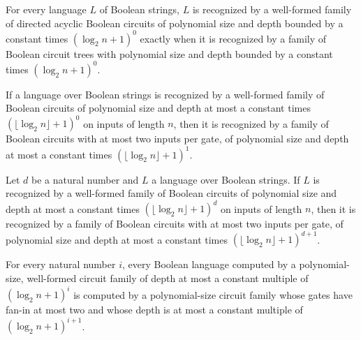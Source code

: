 \begin{theorem}
\label{Language.inAC_zero_iff}
\leanok
{}
For every language $L$ of Boolean strings, $L$ is recognized by a well-formed family of
directed acyclic Boolean circuits of polynomial size and depth bounded by a constant
times $(\log_2 n+1)^0$ exactly when it is recognized by a family of Boolean circuit
trees with polynomial size and depth bounded by a constant times $(\log_2 n+1)^0$.
\end{theorem}

\begin{theorem}
\label{Language.InAC.inNC_one_of_zero}
\leanok
{}
If a language over Boolean strings is recognized by a well-formed family of Boolean
circuits of polynomial size and depth at most a constant times $(\lfloor\log_2
n\rfloor+1)^0$ on inputs of length $n$, then it is recognized by a family of Boolean
circuits with at most two inputs per gate, of polynomial size and depth at most a
constant times $(\lfloor\log_2 n\rfloor+1)^1$.
\end{theorem}

\begin{theorem}
\label{Language.InAC.inNC_succ}
\leanok
{}
Let $d$ be a natural number and $L$ a language over Boolean strings. If $L$ is
recognized by a well-formed family of Boolean circuits of polynomial size and depth at
most a constant times $(\lfloor\log_2 n\rfloor+1)^d$ on inputs of length $n$, then it is
recognized by a family of Boolean circuits with at most two inputs per gate, of
polynomial size and depth at most a constant times $(\lfloor\log_2 n\rfloor+1)^{d+1}$.
\end{theorem}

\begin{theorem}
\label{BoolCircuit.ACLevel_subset_NCLevel_succ}
\leanok
{}
For every natural number $i$, every Boolean language computed by a polynomial-size,
well-formed circuit family of depth at most a constant multiple of $(\log_2 n+1)^i$ is
computed by a polynomial-size circuit family whose gates have fan-in at most two and
whose depth is at most a constant multiple of $(\log_2 n+1)^{i+1}$.
\end{theorem}

